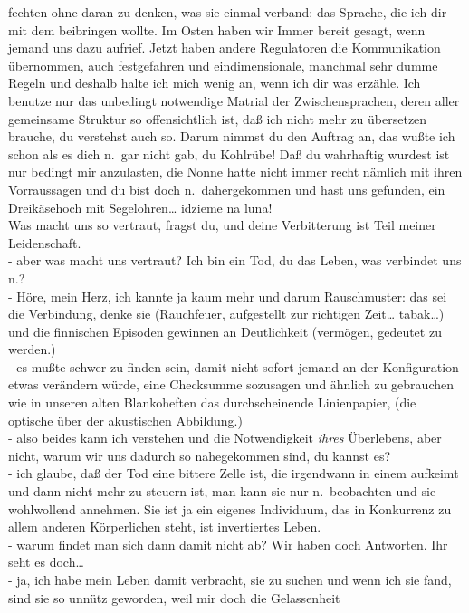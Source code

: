 \documentclass[
]{article}
\begin{document}
fechten ohne daran zu denken, was sie einmal verband: das Sprache, die
ich dir mit dem beibringen wollte. Im Osten haben wir Immer bereit
gesagt, wenn jemand uns dazu aufrief. Jetzt haben andere Regulatoren die
Kommunikation übernommen, auch festgefahren und eindimensionale,
manchmal sehr dumme Regeln und deshalb halte ich mich wenig an, wenn ich
dir was erzähle. Ich benutze nur das unbedingt notwendige Matrial der
Zwischensprachen, deren aller gemeinsame Struktur so offensichtlich ist,
daß ich nicht mehr zu übersetzen brauche, du verstehst auch so. Darum
nimmst du den Auftrag an, das wußte ich schon als es dich n.~gar nicht
gab, du Kohlrübe! Daß du wahrhaftig wurdest ist nur bedingt mir
anzulasten, die Nonne hatte nicht immer recht nämlich mit ihren
Vorraussagen und du bist doch n.~dahergekommen und hast uns gefunden,
ein Dreikäsehoch mit Segelohren\ldots{} idzieme na luna!\\
Was macht uns so vertraut, fragst du, und deine Verbitterung ist Teil
meiner Leidenschaft.\\
- aber was macht uns vertraut? Ich bin ein Tod, du das Leben, was
verbindet uns n.?\\
- Höre, mein Herz, ich kannte ja kaum mehr und darum Rauschmuster: das
sei die Verbindung, denke sie (Rauchfeuer, aufgestellt zur richtigen
Zeit\ldots{} tabak\ldots) und die finnischen Episoden gewinnen an
Deutlichkeit (vermögen, gedeutet zu werden.)\\
- es mußte schwer zu finden sein, damit nicht sofort jemand an der
Konfiguration etwas verändern würde, eine Checksumme sozusagen und
ähnlich zu gebrauchen wie in unseren alten Blankoheften das
durchscheinende Linienpapier, (die optische über der akustischen
Abbildung.)\\
- also beides kann ich verstehen und die Notwendigkeit \emph{ihres}
Überlebens, aber nicht, warum wir uns dadurch so nahegekommen sind, du
kannst es?\\
- ich glaube, daß der Tod eine bittere Zelle ist, die irgendwann in
einem aufkeimt und dann nicht mehr zu steuern ist, man kann sie nur
n.~beobachten und sie wohlwollend annehmen. Sie ist ja ein eigenes
Individuum, das in Konkurrenz zu allem anderen Körperlichen steht, ist
invertiertes Leben.\\
- warum findet man sich dann damit nicht ab? Wir haben doch Antworten.
Ihr seht es doch\ldots{}\\
- ja, ich habe mein Leben damit verbracht, sie zu suchen und wenn ich
sie fand, sind sie so unnütz geworden, weil mir doch die Gelassenheit
\end{document}
